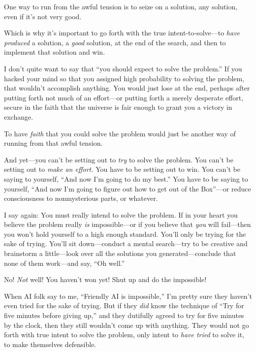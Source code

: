 {
 One way to run from the awful tension is to seize on a solution,
any solution, even if it's not very good.}

{
 Which is why it's important to go forth with the
true intent-to-solve---to \textit{have produced} a solution, a
\textit{good} solution, at the end of the search, and then to implement
that solution and win.}

{
 I don't quite want to say that
``you should expect to solve the
problem.'' If you hacked your mind so that you
assigned high probability to solving the problem, that
wouldn't accomplish anything. You would just lose at
the end, perhaps after putting forth not much of an effort---or putting
forth a merely desperate effort, secure in the faith that the universe
is fair enough to grant you a victory in exchange.}

{
 To have \textit{faith} that you could solve the problem would just
be another way of running from that awful tension.}

{
 And yet---you can't be setting out to \textit{try}
to solve the problem. You can't be setting out to
\textit{make an effort.} You have to be setting out to win. You
can't be saying to yourself, ``And now
I'm going to do my best.'' You have
to be saying to yourself, ``And now
I'm going to figure out how to get out of the
Box''---or reduce consciousness to nonmysterious
parts, or whatever.}

{
 I say again: You must really intend to solve the problem. If in
your heart you believe the problem really \textit{is} impossible---or
if you believe that \textit{you} will fail---then you
won't hold yourself to a high enough standard.
You'll only be trying for the sake of trying.
You'll sit down---conduct a mental search---try to be
creative and brainstorm a little---look over all the solutions you
generated---conclude that none of them work---and say,
``Oh well.''}

{
 No! \textit{Not} well! You haven't won yet! Shut
up and do the impossible!}

{
 When AI folk say to me, ``Friendly AI is
impossible,'' I'm pretty sure they
haven't even tried for the sake of trying. But if they
\textit{did} know the technique of ``Try for five
minutes before giving up,'' and they dutifully agreed
to try for five minutes by the clock, then they still
wouldn't come up with anything. They would not go forth
with true intent to solve the problem, only intent to \textit{have
tried} to solve it, to make themselves defensible.}

